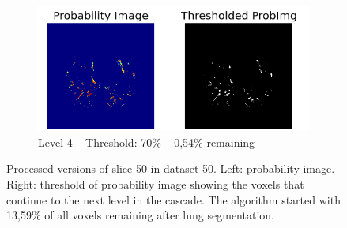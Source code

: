\begin{figure}[p]
\begin{center}
\begin{subfigure}[b]{\linewidth}
	\end{subfigure}
	\begin{subfigure}[b]{\linewidth}
		\includegraphics[width=\linewidth]{img/cascades/D50S50L4.png}
		\caption{Level 4 -- Threshold: 70\% -- 0,54\% remaining}
	\end{subfigure}
  \caption{Processed versions of slice 50 in dataset 50. Left: probability
  image. Right: threshold of probability image showing the voxels that continue
  to the next level in the cascade. The algorithm started with 13,59\% of all 
  voxels remaining after lung segmentation.}
  \label{fig:d50s50}
\end{center}
\end{figure}

